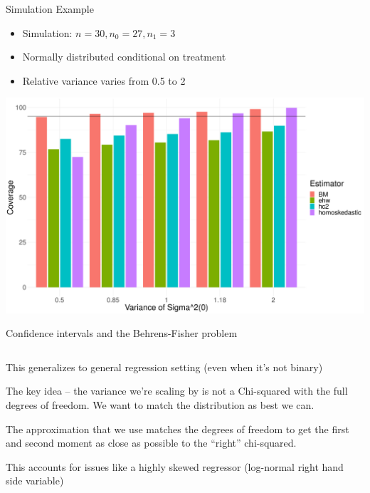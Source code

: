 \documentclass[notes,11pt, aspectratio=169]{beamer}
\newenvironment{wideitemize}{\itemize\addtolength{\itemsep}{10pt}}{\enditemize}
\begin{document}
\begin{frame}{Simulation Example}
  \begin{itemize}
  \item Simulation: $n=30, n_{0} = 27, n_{1} = 3$
  \item Normally distributed conditional on treatment
  \item Relative variance varies from 0.5 to 2
  \end{itemize}
  \begin{center}
  \includegraphics[width=0.7\linewidth]{imbenskolesar_coverage.pdf}
  \end{center}
\end{frame}


\begin{frame}{Confidence intervals and the Behrens-Fisher problem}
\begin{columns}[T] %
\begin{column}{.8\textwidth}
  \begin{wideitemize}
  \item This generalizes to general regression setting (even when it's not binary)
  \item The key idea -- the variance we're scaling by is not a
    Chi-squared with the full degrees of freedom. We want to match the distribution as best we can.
  \item The approximation that we use matches the degrees of freedom
    to get the first and second moment as close as possible to the ``right'' chi-squared.
  \item This accounts for issues like a highly skewed regressor
    (log-normal right hand side variable)
  \end{wideitemize}
  \end{column}%
  \hfill%
  \begin{column}{.5\textwidth}
  \end{column}
\end{columns}
\end{frame}
\end{document}
